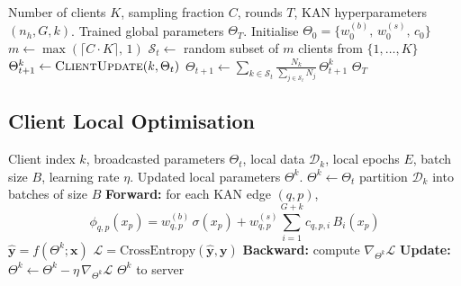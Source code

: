 \begin{algorithm}[t]
\caption{FedKAN-IDS Server Orchestration}
\label{alg:server}
\begin{algorithmic}[1]
\Require Number of clients $K$, sampling fraction $C$, rounds $T$, KAN hyperparameters $(n_h, G, k)$.
\Ensure Trained global parameters $\Theta_T$.
\State Initialise $\Theta_0 = \{w^{(b)}_0,\, w^{(s)}_0,\, c_0\}$
    \State $m \leftarrow \max(\lceil C \cdot K \rceil,\, 1)$
    \State $\mathcal{S}_t \leftarrow$ random subset of $m$ clients from $\{1,\ldots,K\}$
        \State $\Theta^{k}_{t+1} \leftarrow \Call{ClientUpdate}{k, \Theta_t}$
    \EndFor
    \State $\Theta_{t+1} \leftarrow \displaystyle\sum_{k \in \mathcal{S}_t}
                  \frac{N_k}{\sum_{j \in \mathcal{S}_t} N_j}\,\Theta^{k}_{t+1}$
                  \label{alg-server:agg}
\EndFor
\State \Return $\Theta_T$
\end{algorithmic}
\end{algorithm}

\subsection{Client Local Optimisation}\label{subsec:client}

\begin{algorithm}[t]
\caption{FedKAN-IDS \textsc{ClientUpdate}}
\label{alg:client}
\begin{algorithmic}[1]
\Require Client index $k$, broadcasted parameters $\Theta_t$, local data $\mathcal{D}_k$, local epochs $E$, batch size $B$, learning rate $\eta$.
\Ensure Updated local parameters $\Theta^{k}$.
\State $\Theta^{k} \leftarrow \Theta_t$
\State partition $\mathcal{D}_k$ into batches of size $B$
        \State \textbf{Forward:} for each KAN edge $(q, p)$,
        \[
            \phi_{q,p}(x_p) = w^{(b)}_{q,p}\,\sigma(x_p) + w^{(s)}_{q,p} \sum_{i=1}^{G+k} c_{q,p,i}\, B_i(x_p)
        \]
        \State $\hat{\mathbf{y}} = f(\Theta^k; \mathbf{x})$ 
        \State $\mathcal{L} = \mathrm{CrossEntropy}(\hat{\mathbf{y}}, \mathbf{y})$
        \State \textbf{Backward:} compute $\nabla_{\Theta^k}\mathcal{L}$
        \State \textbf{Update:} $\Theta^{k} \leftarrow \Theta^{k} - \eta\, \nabla_{\Theta^k}\mathcal{L}$
        \Statex \quad {}
    \EndFor
\EndFor
\State \Return $\Theta^{k}$ to server
\end{algorithmic}
\end{algorithm}

